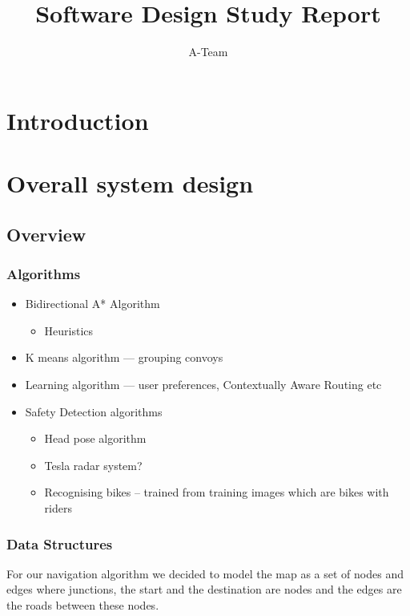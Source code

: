 \documentclass{article}
\title{Software Design Study Report}
\author{A-Team}
\begin{document}
\maketitle

\section{Introduction}
\section{Overall system design}
\subsection{Overview}
\subsubsection{Algorithms}
  \begin{itemize}
      \item Bidirectional A* Algorithm
          \begin{itemize}
              \item Heuristics
          \end{itemize}
      \item K means algorithm --- grouping convoys
      \item Learning algorithm --- user preferences, Contextually Aware Routing etc
      \item Safety Detection algorithms
        \begin{itemize}
            \item Head pose algorithm
            \item Tesla radar system?
            \item Recognising bikes -- trained from training images which are bikes with riders
        \end{itemize}
      
  \end{itemize}

\subsubsection{Data Structures}
For our navigation algorithm we decided to model the map as a set of nodes and edges where junctions, the start and the destination are nodes and the edges are the roads between these nodes.
\end{document}
